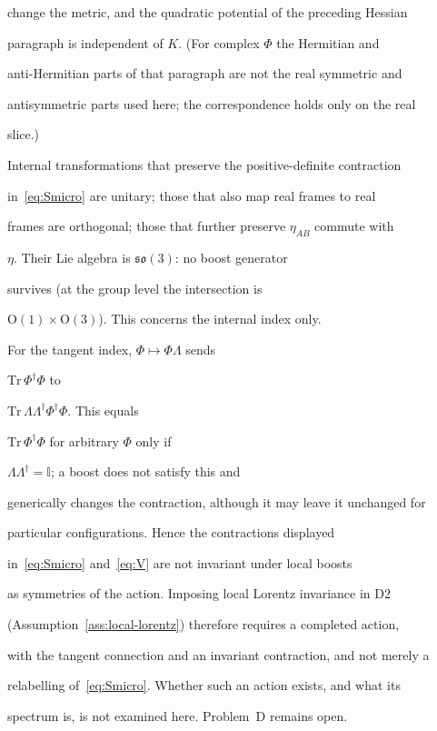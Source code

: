 change the metric, and the quadratic potential of the preceding Hessian

paragraph is independent of \(K\). (For complex \(\Phi\) the Hermitian and

anti-Hermitian parts of that paragraph are not the real symmetric and

antisymmetric parts used here; the correspondence holds only on the real

slice.)



Internal transformations that preserve the positive-definite contraction

in~\eqref{eq:Smicro} are unitary; those that also map real frames to real

frames are orthogonal; those that further preserve \(\eta_{AB}\) commute with

\(\eta\). Their Lie algebra is \(\mathfrak{so}(3)\): no boost generator

survives (at the group level the intersection is

\(\mathrm{O}(1)\times\mathrm{O}(3)\)). This concerns the internal index only.

For the tangent index, \(\Phi\mapsto\Phi\Lambda\) sends

\(\mathrm{Tr}\,\Phi^\dagger\Phi\) to

\(\mathrm{Tr}\,\Lambda\Lambda^\dagger\Phi^\dagger\Phi\). This equals

\(\mathrm{Tr}\,\Phi^\dagger\Phi\) for arbitrary \(\Phi\) only if

\(\Lambda\Lambda^\dagger=\mathbb{I}\); a boost does not satisfy this and

generically changes the contraction, although it may leave it unchanged for

particular configurations. Hence the contractions displayed

in~\eqref{eq:Smicro} and~\eqref{eq:V} are not invariant under local boosts

as symmetries of the action. Imposing local Lorentz invariance in D2

(Assumption~\ref{ass:local-lorentz}) therefore requires a completed action,

with the tangent connection and an invariant contraction, and not merely a

relabelling of~\eqref{eq:Smicro}. Whether such an action exists, and what its

spectrum is, is not examined here. Problem~D remains open.



